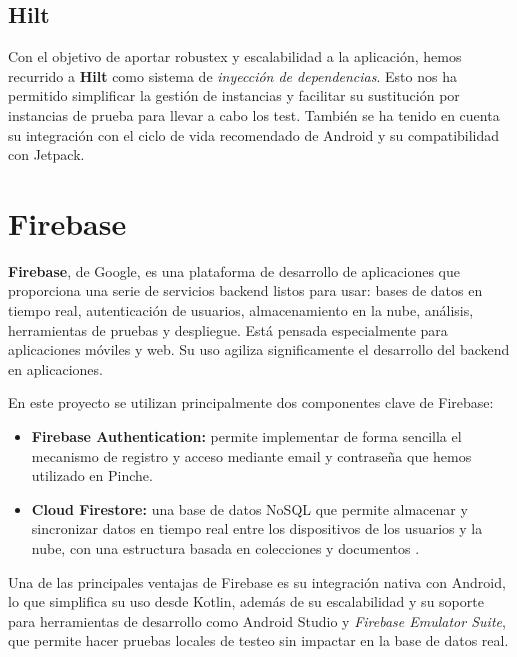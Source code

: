 
\subsection{Hilt}

Con el objetivo de aportar robustex y escalabilidad a la aplicación, hemos recurrido a \textbf{Hilt} como sistema de \textit{inyección de dependencias}. Esto nos ha permitido simplificar la gestión de instancias y facilitar su sustitución por instancias de prueba para llevar a cabo los test. También se ha tenido en cuenta su integración con el ciclo de vida recomendado de Android y su compatibilidad con Jetpack.


\section{Firebase}

\textbf{Firebase}, de Google, es una plataforma de desarrollo de aplicaciones que proporciona una serie de servicios backend listos para usar: bases de datos en tiempo real, autenticación de usuarios, almacenamiento en la nube, análisis, herramientas de pruebas y despliegue. Está pensada especialmente para aplicaciones móviles y web. Su uso agiliza significamente el desarrollo del backend en aplicaciones.

En este proyecto se utilizan principalmente dos componentes clave de Firebase:

\begin{itemize}
    \item \textbf{Firebase Authentication:} permite implementar de forma sencilla el mecanismo de registro y acceso mediante email y contraseña que hemos utilizado en Pinche.

    \item \textbf{Cloud Firestore:} una base de datos NoSQL que permite almacenar y sincronizar datos en tiempo real entre los dispositivos de los usuarios y la nube, con una estructura basada en colecciones y documentos \cite{firestore}.
\end{itemize}

Una de las principales ventajas de Firebase es su integración nativa con Android, lo que simplifica su uso desde Kotlin, además de su escalabilidad y su soporte para herramientas de desarrollo como Android Studio y \textit{Firebase Emulator Suite}, que permite hacer pruebas locales de testeo sin impactar en la base de datos real.

